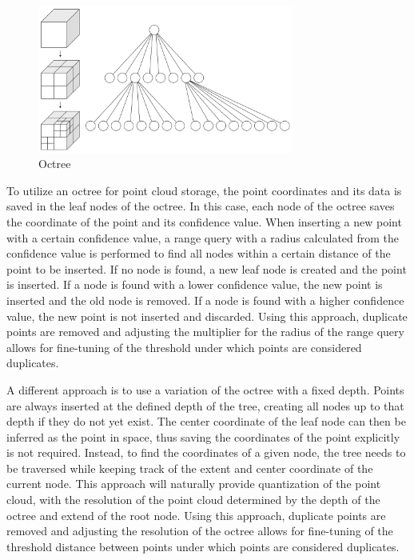\begin{figure}[h]
    \centering
    \includegraphics[width=0.75\textwidth]{images/octree}
    \caption{Octree}
    \label{fig:octrree}
\end{figure}

To utilize an octree for point cloud storage, the point coordinates and its data is saved in the leaf nodes of the octree.
In this case, each node of the octree saves the coordinate of the point and its confidence value.
When inserting a new point with a certain confidence value, a range query with a radius calculated from the confidence value
is performed to find all nodes within a certain distance of the point to be inserted.
If no node is found, a new leaf node is created and the point is inserted.
If a node is found with a lower confidence value, the new point is inserted and the old node is removed.
If a node is found with a higher confidence value, the new point is not inserted and discarded.
Using this approach, duplicate points are removed and adjusting the multiplier for the radius of the range query
allows for fine-tuning of the threshold under which points are considered duplicates.

A different approach is to use a variation of the octree with a fixed depth.
Points are always inserted at the defined depth of the tree, creating all nodes up to that depth if they do not yet exist.
The center coordinate of the leaf node can then be inferred as the point in space,
thus saving the coordinates of the point explicitly is not required.
Instead, to find the coordinates of a given node, the tree needs to be traversed while keeping track of
the extent and center coordinate of the current node.
This approach will naturally provide quantization of the point cloud, with the resolution of the point cloud
determined by the depth of the octree and extend of the root node.
Using this approach, duplicate points are removed and adjusting the resolution of the octree
allows for fine-tuning of the threshold distance between points under which points are considered duplicates.


